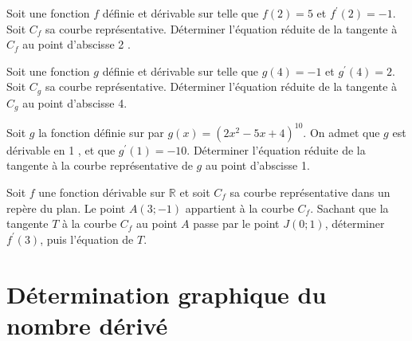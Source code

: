 \documentclass[11pt,a4paper]{article}  %
\begin{document}
\exercice{}

Soit une fonction $f$ définie et dérivable sur \R telle que $f(2)=5$ et $f^{\prime}(2)=-1$.
Soit $C_f$ sa courbe représentative. Déterminer l'équation réduite de la tangente à $C_f$ au point d'abscisse 2 .

\exercice{}

Soit une fonction $g$ définie et dérivable sur \R telle que $g(4)=-1$ et $g^{\prime}(4)=2$. Soit $C_g$ sa courbe représentative. Déterminer l'équation réduite de la tangente à $C_g$ au point d'abscisse 4.

\exercice{}

Soit $g$ la fonction définie sur \R par $g(x)=\left(2 x^2-5 x+4\right)^{10}$. On admet que $g$ est dérivable en 1 , et que $g^{\prime}(1)=-10$. Déterminer l'équation réduite de la tangente à la courbe représentative de $g$ au point d'abscisse 1.

\exercice{}

Soit $f$ une fonction dérivable sur $\mathbb{R}$ et soit $C_f$ sa courbe représentative dans un repère du plan. Le point $A(3 ;-1)$ appartient à la courbe $C_f$.
Sachant que la tangente $T$ à la courbe $C_f$ au point $A$ passe par le point $J(0 ; 1)$, déterminer $f^{\prime}(3)$, puis l'équation de $T$.

\section*{Détermination graphique du nombre dérivé}
\end{document}

